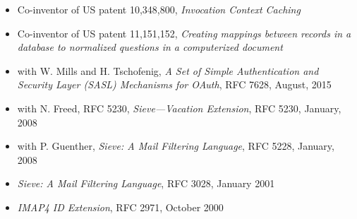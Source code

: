 \documentclass[letterpaper,11pt,twoside]{article}
\begin{document}
\vspace{-6pt}
\begin{itemize}
\item Co-inventor of US patent 10,348,800, {\sl Invocation Context Caching}
\item Co-inventor of US patent 11,151,152, {\sl Creating mappings between
    records in a database to normalized questions in a computerized document}
\item with W. Mills and H. Tschofenig, {\sl A Set of Simple Authentication and
  Security Layer (SASL) Mechanisms for OAuth}, RFC 7628, August, 2015
\item with N. Freed, RFC 5230, {\sl Sieve---Vacation Extension}, RFC
  5230, January, 2008
\item with P. Guenther, {\sl Sieve: A Mail Filtering Language}, RFC
  5228, January, 2008
\item {\sl Sieve: A Mail Filtering Language}, RFC 3028, January 2001
\item {\sl IMAP4 ID Extension}, RFC 2971, October 2000
\end{itemize}
\end{document}
